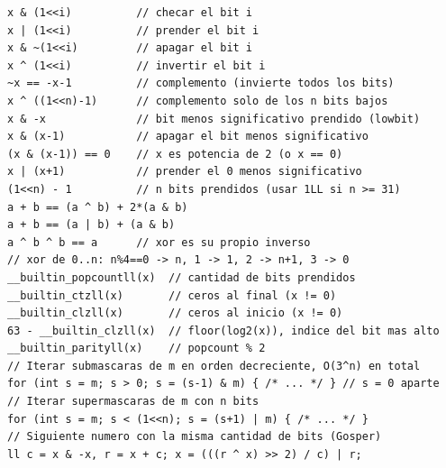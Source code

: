 \begin{lstlisting}
x & (1<<i)          // checar el bit i
x | (1<<i)          // prender el bit i
x & ~(1<<i)         // apagar el bit i
x ^ (1<<i)          // invertir el bit i
~x == -x-1          // complemento (invierte todos los bits)
x ^ ((1<<n)-1)      // complemento solo de los n bits bajos
x & -x              // bit menos significativo prendido (lowbit)
x & (x-1)           // apagar el bit menos significativo
(x & (x-1)) == 0    // x es potencia de 2 (o x == 0)
x | (x+1)           // prender el 0 menos significativo
(1<<n) - 1          // n bits prendidos (usar 1LL si n >= 31)
a + b == (a ^ b) + 2*(a & b)
a + b == (a | b) + (a & b)
a ^ b ^ b == a      // xor es su propio inverso
// xor de 0..n: n%4==0 -> n, 1 -> 1, 2 -> n+1, 3 -> 0
__builtin_popcountll(x)  // cantidad de bits prendidos
__builtin_ctzll(x)       // ceros al final (x != 0)
__builtin_clzll(x)       // ceros al inicio (x != 0)
63 - __builtin_clzll(x)  // floor(log2(x)), indice del bit mas alto
__builtin_parityll(x)    // popcount % 2
// Iterar submascaras de m en orden decreciente, O(3^n) en total
for (int s = m; s > 0; s = (s-1) & m) { /* ... */ } // s = 0 aparte
// Iterar supermascaras de m con n bits
for (int s = m; s < (1<<n); s = (s+1) | m) { /* ... */ }
// Siguiente numero con la misma cantidad de bits (Gosper)
ll c = x & -x, r = x + c; x = (((r ^ x) >> 2) / c) | r;
\end{lstlisting}
